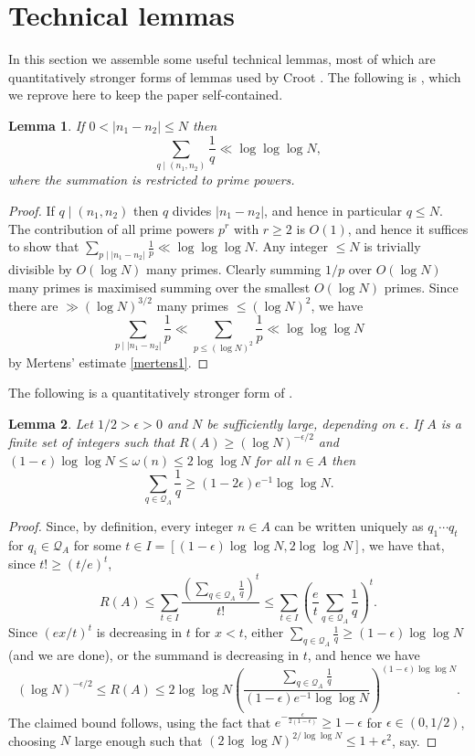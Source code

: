 \documentclass[12pt]{amsart}
\newcommand{\abs}[1]{\left\lvert #1\right\rvert}
\newcommand{\brac}[1]{\left( #1\right)}
\newtheorem{lemma}{Lemma}
\begin{document}
\section{Technical lemmas}
In this section we assemble some useful technical lemmas, most of which are quantitatively stronger forms of lemmas used by Croot \cite{Cr2003}. The following is \cite[Lemma 2]{Cr2003}, which we reprove here to keep the paper self-contained.
\begin{lemma}\label{lem-basic}
If $0<\abs{n_1-n_2}\leq N$ then
\[\sum_{q\mid (n_1,n_2)}\frac{1}{q}\ll \log\log\log N,\]
where the summation is restricted to prime powers.
\end{lemma}
\begin{proof}
If $q\mid (n_1,n_2)$ then $q$ divides $\abs{n_1-n_2}$, and hence in particular $q\leq N$. The contribution of all prime powers $p^r$ with $r\geq 2$ is $O(1)$, and hence it suffices to show that $\sum_{p\mid \abs{n_1-n_2}}\frac{1}{p}\ll \log\log\log N$. Any integer $\leq N$ is trivially divisible by $O(\log N)$ many primes. Clearly summing $1/p$ over $O(\log N)$ many primes is maximised summing over the smallest $O(\log N)$ primes. Since there are $\gg (\log N)^{3/2}$ many primes $\leq (\log N)^2$, we have
\[\sum_{p\mid \abs{n_1-n_2}}\frac{1}{p}\ll \sum_{p\leq (\log N)^2}\frac{1}{p}\ll \log\log\log N\]
by Mertens' estimate \eqref{mertens1}.
\end{proof}
The following is a quantitatively stronger form of \cite[Lemma 3]{Cr2003}.
\begin{lemma}\label{lem-rtop}
Let $1/2>\epsilon>0$ and $N$ be sufficiently large, depending on $\epsilon$. If $A$ is a finite set of integers such that $R(A)\geq (\log N)^{-\epsilon/2}$ and $(1-\epsilon)\log\log N\leq \omega(n)\leq  2\log\log N$ for all $n\in A$ then 
\[\sum_{q\in\mathcal{Q}_A}\frac{1}{q} \geq (1-2\epsilon)e^{-1}\log\log N.\]
\end{lemma}
\begin{proof}
Since, by definition, every integer $n\in A$ can be written uniquely as $q_1\cdots q_t$ for $q_i\in \mathcal{Q}_A$ for some $t\in I = [(1-\epsilon)\log\log N, 2\log\log N]$, we have that, since $t!\geq (t/e)^t$, 
\[R(A)\leq  \sum_{t\in I}\frac{\brac{\sum_{q\in \mathcal{Q}_A}\frac{1}{q}}^t}{t!}\leq \sum_{t\in I}\brac{\frac{e}{t}\sum_{q\in \mathcal{Q}_A}\frac{1}{q}}^t.\]
Since $(ex/t)^t$ is decreasing in $t$ for $x<t$, either $\sum_{q\in \mathcal{Q}_A}\frac{1}{q}\geq (1-\epsilon)\log\log N$ (and we are done), or the summand is decreasing in $t$, and hence we have
\[(\log N)^{-\epsilon/2}\leq R(A)\leq 2\log\log N\brac{\frac{\sum_{q\in \mathcal{Q}_A}\frac{1}{q}}{(1-\epsilon)e^{-1}\log\log N}}^{(1-\epsilon)\log\log N}.\]
The claimed bound follows, using the fact that $e^{-\frac{\epsilon}{2(1-\epsilon)}}\geq 1-\epsilon$ for $\epsilon\in (0,1/2)$, choosing $N$ large enough such that $(2\log\log N)^{2/\log\log N}\leq 1+\epsilon^2$, say. 
\end{proof}
\end{document}
